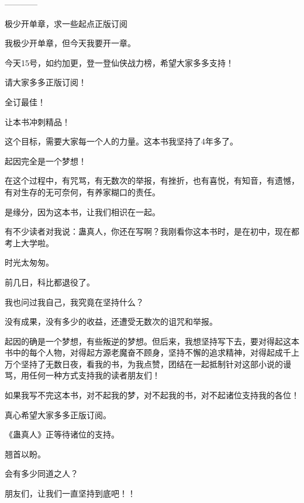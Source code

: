 \begin{this_body}
------------

极少开单章，求一些起点正版订阅

我极少开单章，但今天我要开一章。

今天15号，如约加更，登一登仙侠战力榜，希望大家多多支持！

请大家多多正版订阅！

全订最佳！

让本书冲刺精品！

这个目标，需要大家每一个人的力量。这本书我坚持了4年多了。

起因完全是一个梦想！

在这个过程中，有咒骂，有无数次的举报，有挫折，也有喜悦，有知音，有遗憾，有对生存的无可奈何，有养家糊口的责任。

是缘分，因为这本书，让我们相识在一起。

有不少读者对我说：蛊真人，你还在写啊？我刚看你这本书时，是在初中，现在都考上大学啦。

时光太匆匆。

前几日，科比都退役了。

我也问过我自己，我究竟在坚持什么？

没有成果，没有多少的收益，还遭受无数次的诅咒和举报。

起因的确是一个梦想，有些叛逆的梦想。但后来，我想坚持写下去，要对得起这本书中的每个人物，对得起方源老魔奋不顾身，坚持不懈的追求精神，对得起成千上万个坚持了无数日夜，看我的书，为我点赞，团结在一起抵制针对这部小说的谩骂，用任何一种方式支持我的读者朋友们！

如果我写不完这本书，对不起我的梦，对不起我的书，对不起诸位支持我的各位！

真心希望大家多多正版订阅。

《蛊真人》正等待诸位的支持。

翘首以盼。

会有多少同道之人？

朋友们，让我们一直坚持到底吧！！

\end{this_body}

